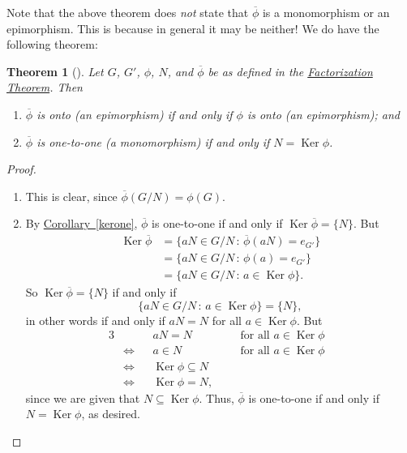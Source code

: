 \documentclass[10pt,]{book}
\theoremstyle{plain}
\newtheorem{theorem}{Theorem}[section]
\theoremstyle{definition}
\theoremstyle{definition}
\theoremstyle{definition}
\theoremstyle{definition}
\numberwithin{equation}{section}
\def\phibar{\overline{\phi}}
\DeclareMathOperator{\Ker}{Ker}
\newcommand{\amp}{&}
\begin{document}
Note that the above theorem does \emph{not} state that \(\phibar\) is a monomorphism or an epimorphism. This is because in general it may be neither! We do have the following theorem:%
\begin{theorem}[{}]\label{epimono}
Let \(G\), \(G'\), \(\phi\), \(N\), and \(\phibar\) be as defined in the  \hyperref[facthm]{Factorization Theorem}. Then \leavevmode%
\begin{enumerate}
\item\hypertarget{li-526}{}\(\phibar\) is onto (an epimorphism) if and only if \(\phi\) is onto (an epimorphism); and%
\item\hypertarget{li-527}{}\(\phibar\) is one-to-one (a monomorphism) if and only if \(N=\Ker
\phi\).%
\end{enumerate}
%
\end{theorem}
\begin{proof}\hypertarget{proof-56}{}
\leavevmode%
\begin{enumerate}
\item\hypertarget{li-528}{}This is clear, since \(\phibar(G/N)=\phi(G)\).%
\item\hypertarget{li-529}{}By \hyperref[kerone]{Corollary~\ref{kerone}}, \(\phibar\) is one-to-one if and only if \(\Ker
\phibar=\{N\}\).  But%
\begin{align*}
\Ker \phibar\amp =\{aN\in G/N
\,:\, \phibar(aN)=e_{G'}\}\\
\amp =\{aN\in G/N \,:\,
\phi(a)=e_{G'}\}\\
\amp =\{aN\in G/N \,:\, a\in
\Ker\phi\}.
\end{align*}
So \(\Ker \phibar = \{N\}\) if and only if%
\begin{equation*}
\{aN\in G/N\,:\,a\in \Ker\phi\}=\{N\},
\end{equation*}
in other words if and only if \(aN=N\) for all \(a\in \Ker\phi\).  But%
\begin{align*}
{3}
\amp \amp \amp aN=N \amp \amp \ \ \text{ for all \(a\in \Ker\phi\) }\\
\amp \Leftrightarrow  \amp \amp  a\in N \amp \amp \ \ \text{ for all \(a\in \Ker\phi\) }\\
\amp \Leftrightarrow  \amp \amp  \Ker \phi\subseteq N\amp \amp\\
\amp \Leftrightarrow  \amp \amp  \Ker\phi=N,\amp \amp
\end{align*}
since we are given that \(N\subseteq \Ker \phi\). Thus, \(\phibar\) is one-to-one if and only if \(N=\Ker\phi\), as desired.%
\end{enumerate}
%
\end{proof}
\end{document}
